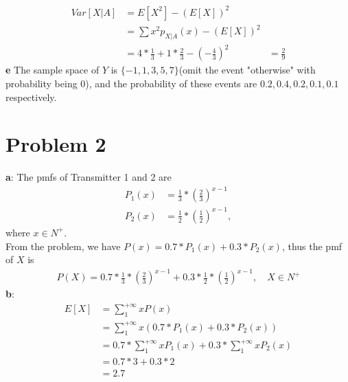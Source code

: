 \documentclass[12pt,letterpaper]{article}
\begin{document}
    \begin{equation*}
        \begin{aligned}
            Var[X | A] &= E[X^{2}] - (E[X])^{2} \\
            &= \sum x^{2}p_{X | A}(x) - (E[X])^{2} \\
            &= 4 * \frac{1}{3} + 1 * \frac{2}{3} - (-\frac{4}{3})^{2}
            &= \frac{2}{9}
        \end{aligned}
    \end{equation*}
    \textbf{e} The sample space of $Y$ is $\{-1, 1, 3, 5, 7\}$(omit the event "otherwise" with probability being 0), and the probability of these events are $0.2, 0.4, 0.2, 0.1, 0.1$ respectively.

\section*{Problem 2}
    \textbf{a}: The pmfs of Transmitter 1 and 2 are
        \begin{equation*}
            \begin{aligned}
                P_{1}(x) &= \frac{1}{3} * (\frac{2}{3})^{x - 1} \\
                P_{2}(x) &= \frac{1}{2} * (\frac{1}{2})^{x - 1},
            \end{aligned}
        \end{equation*}
    where $x \in N^{+}$. \\
    From the problem, we have $P(x) = 0.7 * P_{1}(x) + 0.3 * P_{2}(x)$, thus the pmf of $X$ is
        \begin{equation*}
            \begin{aligned}
                P(X) = 0.7 * \frac{1}{3} * (\frac{2}{3})^{x - 1} + 0.3 * \frac{1}{2} * (\frac{1}{2})^{x - 1}, \quad X \in N^{+}
            \end{aligned}
        \end{equation*}
    \textbf{b}:
        \begin{equation*}
            \begin{aligned}
                E[X] &= \sum_{1}^{+\infty} xP(x) \\
                &= \sum_{1}^{+\infty} x(0.7 * P_{1}(x) + 0.3 * P_{2}(x)) \\
                &= 0.7 * \sum_{1}^{+\infty} xP_{1}(x) + 0.3 * \sum_{1}^{+\infty} xP_{2}(x) \\
                &= 0.7 * 3 + 0.3 * 2 \\
                &= 2.7
            \end{aligned}
        \end{equation*}
\end{document}
